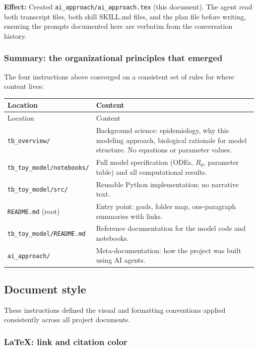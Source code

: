 \documentclass[11pt]{article}
\begin{document}
\noindent \textbf{Effect:} Created \texttt{ai\_approach/ai\_approach.tex} (this document). The agent read both transcript files, both skill SKILL.md files, and the plan file before writing, ensuring the prompts documented here are verbatim from the conversation history.

\subsubsection{Summary: the organizational principles that emerged}

The four instructions above converged on a consistent set of rules for where content lives:

\begin{longtable}{@{}p{4.5cm}p{8.8cm}@{}}
\toprule
Location & Content \\
\midrule
\endfirsthead
\toprule
Location & Content \\
\midrule
\endhead
\texttt{tb\_overview/} & Background science: epidemiology, why this modeling approach, biological rationale for model structure. No equations or parameter values. \\
\texttt{tb\_toy\_model/notebooks/} & Full model specification (ODEs, $R_0$, parameter table) and all computational results. \\
\texttt{tb\_toy\_model/src/} & Reusable Python implementation; no narrative text. \\
\texttt{README.md} (root) & Entry point: goals, folder map, one-paragraph summaries with links. \\
\texttt{tb\_toy\_model/README.md} & Reference documentation for the model code and notebooks. \\
\texttt{ai\_approach/} & Meta-documentation: how the project was built using AI agents. \\
\bottomrule
\end{longtable}

\subsection{Document style}

These instructions defined the visual and formatting conventions applied consistently across all project documents.

\subsubsection{LaTeX: link and citation color}
\end{document}
